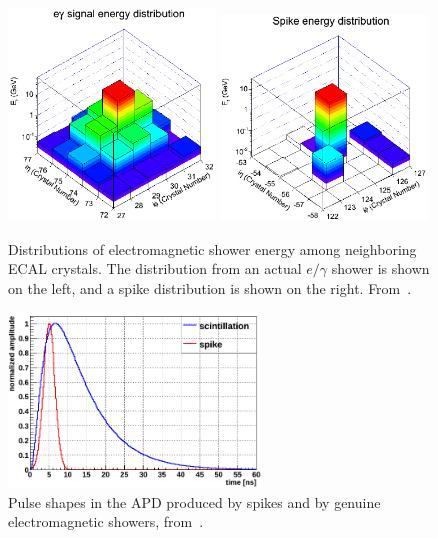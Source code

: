 \documentclass[oneside, letterpaper, 12pt, oldfontcommands]{memoir}
\begin{document}
\begin{figure}[hbtp]
  \begin{center}
    \includegraphics[width=0.49\textwidth]{Figures/real_egamma_energy_distribution.png}
    \includegraphics[width=0.49\textwidth]{Figures/spike_energy_distribution.png}
    \caption{Distributions of electromagnetic shower energy among neighboring ECAL crystals. The distribution from an actual
    $e/\gamma$ shower is shown on the left, and a spike distribution is shown on the right. From~\cite{ref:spikes_farzanehfar}.}
    \label{fig:spike_energy_distribution}
  \end{center}
\end{figure}

\begin{figure}[hbtp]
  \begin{center}
    \includegraphics[width=0.60\textwidth]{Figures/spike_pulse.png}
    \caption{Pulse shapes in the APD produced by spikes and by genuine electromagnetic showers, from~\cite{ref:DN-2015/014}.}
    \label{fig:spike_pulse_shape}
  \end{center}
\end{figure}
\end{document}

